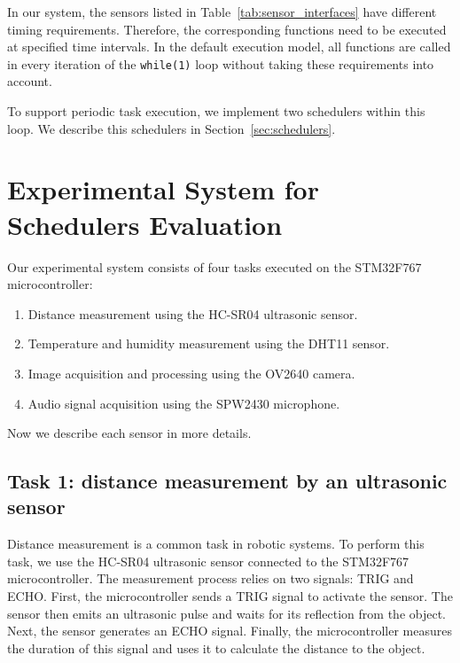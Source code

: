 \documentclass[conference]{IEEEtran}
\begin{document}
In our system, the sensors listed in Table~\ref{tab:sensor_interfaces} have different timing requirements. Therefore, the corresponding functions need to be executed at specified time intervals. In the default execution model, all functions are called in every iteration of the \texttt{while(1)} loop without taking these requirements into account.


To support periodic task execution, we implement two schedulers within this loop. We describe this schedulers in Section~\ref{sec:schedulers}.







\section{Experimental System for Schedulers Evaluation}
\label{sec:workloads}


Our experimental system consists of four tasks executed on the STM32F767 microcontroller:

%
\begin{enumerate}
	\item Distance measurement using the HC-SR04 ultrasonic sensor.
	\item Temperature and humidity measurement using the DHT11 sensor.
	\item Image acquisition and processing using the OV2640 camera.
	\item Audio signal acquisition using the SPW2430 microphone.
\end{enumerate}

Now we describe each sensor in more details.

\subsection{Task 1: distance measurement by an ultrasonic sensor}

Distance measurement is a common task in robotic systems. To perform this task, we use the HC-SR04 ultrasonic sensor connected to the STM32F767 microcontroller. The measurement process relies on two signals: TRIG and ECHO. First, the microcontroller sends a TRIG signal to activate the sensor. The sensor then emits an ultrasonic pulse and waits for its reflection from the object. Next, the sensor generates an ECHO signal. Finally, the microcontroller measures the duration of this signal and uses it to calculate the distance to the object. 
\end{document}
